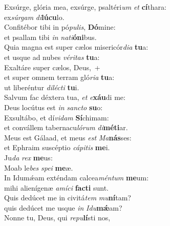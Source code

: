 \evenverse Exsúrge, glória mea, exsúrge, psaltéri\textit{um} \textit{et} \textbf{cí}thara:~\*\\
\evenverse ex\textit{súr}\textit{gam} \textit{di}\textbf{lú}\textbf{cu}lo.\\
\oddverse Confitébor tibi in pó\textit{pu}\textit{lis}, \textbf{Dó}mine:~\*\\
\oddverse et psallam tibi \textit{in} \textit{na}\textit{ti}\textbf{ó}\textbf{ni}bus.\\
\evenverse Quia magna est super cælos misericór\textit{di}\textit{a} \textbf{tu}a:~\*\\
\evenverse et usque ad nubes \textit{vé}\textit{ri}\textit{tas} \textbf{tu}a:\\
\oddverse Exaltáre super cælos, Deus,~+\\
\oddverse  et super omnem terram gló\textit{ri}\textit{a} \textbf{tu}a:~\*\\
\oddverse ut liberéntur \textit{di}\textit{lé}\textit{cti} \textbf{tu}i.\\
\evenverse Salvum fac déxtera tua, \textit{et} \textit{e}\textbf{xáu}di me:~\*\\
\evenverse Deus locútus est \textit{in} \textit{san}\textit{cto} \textbf{su}o:\\
\oddverse Exsultábo, et dí\textit{vi}\textit{dam} \textbf{Sí}chimam:~\*\\
\oddverse et convállem tabernacu\textit{ló}\textit{rum} \textit{di}\textbf{mé}\textbf{ti}ar.\\
\evenverse Meus est Gálaad, et meus \textit{est} \textit{Ma}\textbf{nás}ses:~\*\\
\evenverse et Ephraim suscéptio \textit{cá}\textit{pi}\textit{tis} \textbf{me}i.\\
\oddverse Ju\textit{da} \textit{rex} \textbf{me}us:~\*\\
\oddverse Moab le\textit{bes} \textit{spe}\textit{i} \textbf{me}æ.\\
\evenverse In Idumǽam exténdam calcea\textit{mén}\textit{tum} \textbf{me}um:~\*\\
\evenverse mihi alienígenæ \textit{a}\textit{mí}\textit{ci} \textbf{fa}\textbf{cti} sunt.\\
\oddverse Quis dedúcet me in civitá\textit{tem} \textit{mu}\textbf{ní}tam?~\*\\
\oddverse quis dedúcet me usque \textit{in} \textit{I}\textit{du}\textbf{mǽ}am?\\
\evenverse Nonne tu, Deus, qui \textit{re}\textit{pu}\textbf{lí}sti nos,~\*\\
